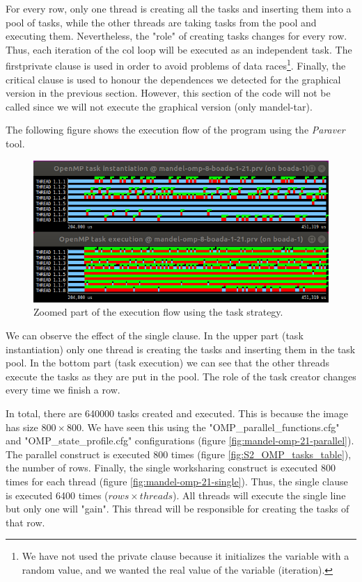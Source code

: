 \documentclass[12pt, a4paper]{article}
\begin{document}
For every row, only one thread is creating all the tasks and inserting them into a pool of tasks, while the other threads are taking tasks from the pool and executing them. Nevertheless, the "role" of creating tasks changes for every row. Thus, each iteration of the col loop will be executed as an independent task. The firstprivate clause is used in order to avoid problems of data races\footnote{We have not used the private clause because it initializes the variable with a random value, and we wanted the real value of the variable (iteration).}. Finally, the critical clause is used to honour the dependences we detected for the graphical version in the previous section. However, this section of the code will not be called since we will not execute the graphical version (only mandel-tar).

The following figure shows the execution flow of the program using the \textit{Paraver} tool.

\begin{figure}[H]
	\centering
	\includegraphics[scale=0.40]{./S2_OMP_tasks}
	\caption{Zoomed part of the execution flow using the task strategy.}
	\label{fig:S2_OMP_tasks}
\end{figure}

We can observe the effect of the single clause. In the upper part (task instantiation) only one thread is creating the tasks and inserting them in the task pool. In the bottom part (task execution) we can see that the other threads execute the tasks as they are put in the pool. The role of the task creator changes every time we finish a row.

In total, there are 640000 tasks created and executed. This is because the image has size $800 \times 800$. We have seen this using the "OMP\_parallel\_functions.cfg" and "OMP\_state\_profile.cfg" configurations (figure \ref{fig:mandel-omp-21-parallel}). The parallel construct is executed 800 times (figure \ref{fig:S2_OMP_tasks_table}), the number of rows. Finally, the single worksharing construct is executed 800 times for each thread (figure \ref{fig:mandel-omp-21-single}). Thus, the single clause is executed 6400 times ($rows \times threads$). All threads will execute the single line but only one will "gain". This thread will be responsible for creating the tasks of that row.
\end{document}
